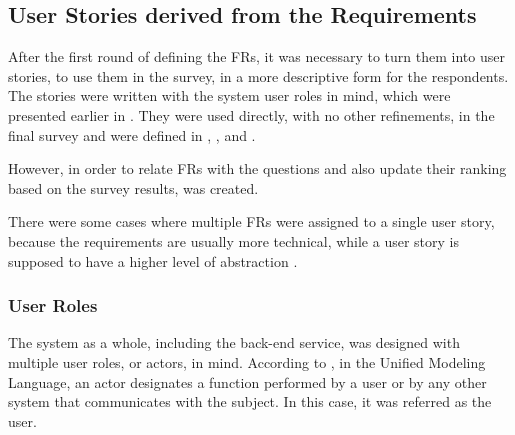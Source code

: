 \subsection{User Stories derived from the Requirements}\label{ext:user-stories}

After the first round of defining the \acp{FR}, it was necessary to turn them into user stories, to use them in the survey, in a more descriptive form for the respondents. The stories were written with the system user roles in mind, which were presented earlier in . They were used directly, with no other refinements, in the final survey and were defined in , ,  and .






However, in order to relate \acp{FR} with the questions and also update their ranking based on the survey results,  was created.



There were some cases where multiple \acp{FR} were assigned to a single user story, because the requirements are usually more technical, while a user story is supposed to have a higher level of abstraction \cite{DIMITRIJEVIC2015352}.

\subsubsection{User Roles}\label{ext:user-roles}

The system as a whole, including the back-end service, was designed with multiple user roles, or actors, in mind. According to \textcite{omg_2017}, in the Unified Modeling Language, an actor designates a function performed by a user or by any other system that communicates with the subject. In this case, it was referred as the user.

